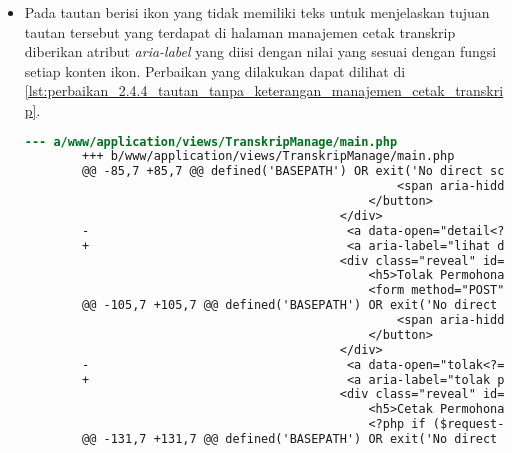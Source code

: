 \begin{itemize}
    \item Pada tautan berisi ikon yang tidak memiliki teks untuk menjelaskan tujuan tautan tersebut yang terdapat di halaman manajemen cetak transkrip diberikan atribut \textit{aria-label} yang diisi dengan nilai yang sesuai dengan fungsi setiap konten ikon. Perbaikan yang dilakukan dapat dilihat di \ref{lst:perbaikan_2.4.4_tautan_tanpa_keterangan_manajemen_cetak_transkrip}.
    \begin{lstlisting}[frame=single, label={lst:perbaikan_2.4.4_tautan_tanpa_keterangan_manajemen_cetak_transkrip}, language=diff, caption=Perbaikan Kriteria Sukses 2.4.4 - Tautan Tanpa Keterangan di Halaman Manajemen Cetak Transkrip]
        --- a/www/application/views/TranskripManage/main.php
        +++ b/www/application/views/TranskripManage/main.php
        @@ -85,7 +85,7 @@ defined('BASEPATH') OR exit('No direct script access allowed');
                                                    <span aria-hidden="true">&times;</span>
                                                </button>                                        
                                            </div>
        -                                    <a data-open="detail<?= $request->id ?>"><i class="fi-eye"></i></a>
        +                                    <a aria-label="lihat detail permohonan" data-open="detail<?= $request->id ?>"><i class="fi-eye"></i></a>
                                            <div class="reveal" id="tolak<?= $request->id ?>" data-reveal>
                                                <h5>Tolak Permohonan</h5>
                                                <form method="POST" action="/TranskripManage/answer">
        @@ -105,7 +105,7 @@ defined('BASEPATH') OR exit('No direct script access allowed');
                                                    <span aria-hidden="true">&times;</span>
                                                </button>
                                            </div>
        -                                    <a data-open="tolak<?= $request->id ?>"><i class="fi-dislike"></i></a>
        +                                    <a aria-label="tolak permohonan" data-open="tolak<?= $request->id ?>"><i class="fi-dislike"></i></a>
                                            <div class="reveal" id="cetak<?= $request->id ?>" data-reveal>
                                                <h5>Cetak Permohonan</h5>
                                                <?php if ($request->requestByNPM !== NULL): ?>
        @@ -131,7 +131,7 @@ defined('BASEPATH') OR exit('No direct script access allowed');

\end{lstlisting}
\end{itemize}
